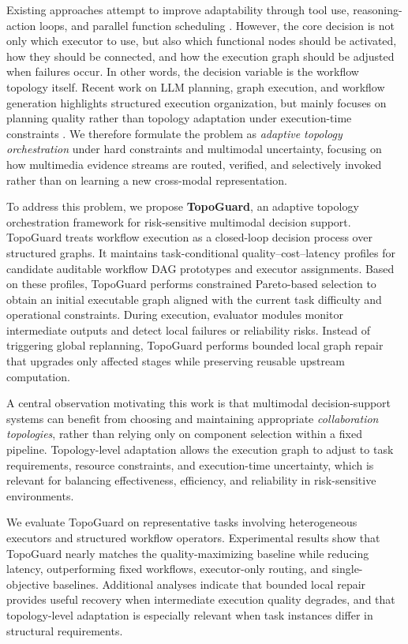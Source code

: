 \documentclass[acmsmall,review,anonymous]{acmart}
\begin{document}
Existing approaches attempt to improve adaptability through tool use, reasoning-action loops, and parallel function scheduling \cite{schick2023toolformer,yao2023react,kim2024llm}. However, the core decision is not only which executor to use, but also which functional nodes should be activated, how they should be connected, and how the execution graph should be adjusted when failures occur. In other words, the decision variable is the workflow topology itself. Recent work on LLM planning, graph execution, and workflow generation highlights structured execution organization, but mainly focuses on planning quality rather than topology adaptation under execution-time constraints \cite{huang2024understanding,zhai2025survey,li2024autoflow,zhang2024aflow,fan2024workflowllm,huang2023dag,peled2021graph}. We therefore formulate the problem as \emph{adaptive topology orchestration} under hard constraints and multimodal uncertainty, focusing on how multimedia evidence streams are routed, verified, and selectively invoked rather than on learning a new cross-modal representation.

To address this problem, we propose \textbf{TopoGuard}, an adaptive topology orchestration framework for risk-sensitive multimodal decision support. TopoGuard treats workflow execution as a closed-loop decision process over structured graphs. It maintains task-conditional quality--cost--latency profiles for candidate auditable workflow DAG prototypes and executor assignments. Based on these profiles, TopoGuard performs constrained Pareto-based selection to obtain an initial executable graph aligned with the current task difficulty and operational constraints. During execution, evaluator modules monitor intermediate outputs and detect local failures or reliability risks. Instead of triggering global replanning, TopoGuard performs bounded local graph repair that upgrades only affected stages while preserving reusable upstream computation.

A central observation motivating this work is that multimodal decision-support systems can benefit from choosing and maintaining appropriate \emph{collaboration topologies}, rather than relying only on component selection within a fixed pipeline. Topology-level adaptation allows the execution graph to adjust to task requirements, resource constraints, and execution-time uncertainty, which is relevant for balancing effectiveness, efficiency, and reliability in risk-sensitive environments.

We evaluate TopoGuard on representative tasks involving heterogeneous executors and structured workflow operators. Experimental results show that TopoGuard nearly matches the quality-maximizing baseline while reducing latency, outperforming fixed workflows, executor-only routing, and single-objective baselines. Additional analyses indicate that bounded local repair provides useful recovery when intermediate execution quality degrades, and that topology-level adaptation is especially relevant when task instances differ in structural requirements.
\end{document}
